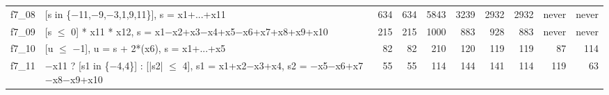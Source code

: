 \begin{tabularx}{\linewidth}{l>{\raggedright\arraybackslash}Xrrrrrrrr}
f7\_08 & {\scriptsize [s in \{$-$11,\allowbreak{}$-$9,\allowbreak{}$-$3,\allowbreak{}1,\allowbreak{}9,\allowbreak{}11\}],\allowbreak{} s = x1+...+\allowbreak{}x11} & 634 & 634 & 5843 & 3239 & 2932 & 2932 & never & never\\
f7\_09 & {\scriptsize [s $\le$ 0] * x11 * x12,\allowbreak{} s = x1\allowbreak{}$-$x2+\allowbreak{}x3\allowbreak{}$-$x4+\allowbreak{}x5\allowbreak{}$-$x6+\allowbreak{}x7+\allowbreak{}x8+\allowbreak{}x9+\allowbreak{}x10} & 215 & 215 & 1000 & 883 & 928 & 883 & never & never\\
f7\_10 & {\scriptsize [u $\le$ $-$1],\allowbreak{} u = s + 2*(x6),\allowbreak{} s = x1+...+\allowbreak{}x5} & 82 & 82 & 210 & 120 & 119 & 119 & 87 & 114\\
f7\_11 & {\scriptsize $-$x11 ? [s1 in \{$-$4,\allowbreak{}4\}] : [|s2| $\le$ 4],\allowbreak{} s1 = x1+\allowbreak{}x2\allowbreak{}$-$x3+\allowbreak{}x4,\allowbreak{} s2 = $-$x5\allowbreak{}$-$x6+\allowbreak{}x7\allowbreak{}$-$x8\allowbreak{}$-$x9+\allowbreak{}x10} & 55 & 55 & 114 & 144 & 141 & 114 & 119 & 63\\
\bottomrule
\end{tabularx}
